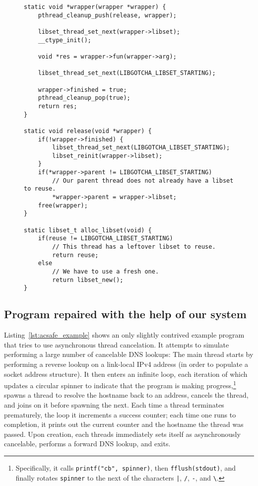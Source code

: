 \begin{figure}
\begin{lstlisting}[label=lst:acsafe_helpers,caption=\textit{libac-safe}'s thread initializer and cleanup handler]
static void *wrapper(wrapper *wrapper) {
	pthread_cleanup_push(release, wrapper);

	libset_thread_set_next(wrapper->libset);
	__ctype_init();

	void *res = wrapper->fun(wrapper->arg);

	libset_thread_set_next(LIBGOTCHA_LIBSET_STARTING);

	wrapper->finished = true;
	pthread_cleanup_pop(true);
	return res;
}

static void release(void *wrapper) {
	if(!wrapper->finished) {
		libset_thread_set_next(LIBGOTCHA_LIBSET_STARTING);
		libset_reinit(wrapper->libset);
	}
	if(*wrapper->parent != LIBGOTCHA_LIBSET_STARTING)
		// Our parent thread does not already have a libset to reuse.
		*wrapper->parent = wrapper->libset;
	free(wrapper);
}

static libset_t alloc_libset(void) {
	if(reuse != LIBGOTCHA_LIBSET_STARTING)
		// This thread has a leftover libset to reuse.
		return reuse;
	else
		// We have to use a fresh one.
		return libset_new();
}
\end{lstlisting}
\end{figure}


\subsection{Program repaired with the help of our system}

Listing~\ref{lst:acsafe_example} shows an only slightly contrived example program
that tries to use asynchronous thread cancelation.  It attempts to simulate
performing a large number of cancelable DNS lookups:  The main thread starts by
performing a reverse lookup on a link-local IPv4 address (in order to populate a
socket address structure).  It then enters an infinite loop, each iteration of which
updates a circular spinner to indicate that the program is making
progress,\footnote{Specifically, it calls \lstinline'printf("cb", spinner)', then
\lstinline'fflush(stdout)', and finally rotates \texttt{spinner} to the next of the
characters \texttt{|}, \texttt{/}, \texttt{-}, and \texttt{\textbackslash}.} spawns
a thread to resolve the hostname back to an address, cancels the thread, and joins on
it before spawning the next.  Each time a thread terminates prematurely, the loop it
increments a success counter; each time one runs to completion, it prints out the
current counter and the hostname the thread was passed.  Upon creation, each threads
immediately sets itself as asynchronously cancelable, performs a forward DNS lookup,
and exits.


